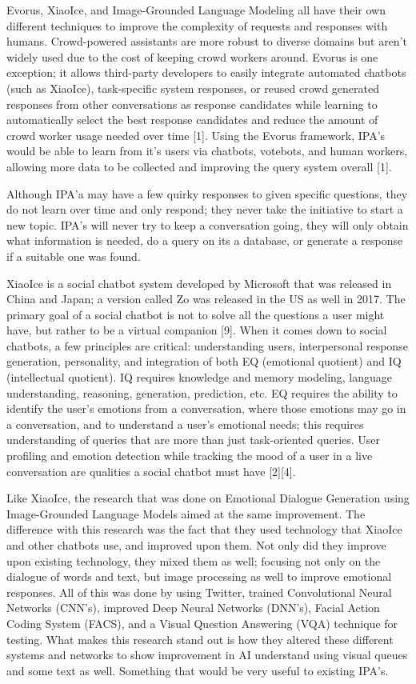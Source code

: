 \documentclass[letterpaper, 10 pt, conference]{IEEEtran}
\begin{document}
Evorus, XiaoIce, and Image-Grounded Language Modeling all have their own different techniques to improve the complexity of requests and responses with humans. Crowd-powered assistants are more robust to diverse domains but aren't widely used due to the cost of keeping crowd workers around. Evorus is one exception; it allows third-party developers to easily integrate automated chatbots (such as XiaoIce), task-specific system responses, or reused crowd generated responses from other conversations as response candidates while learning to automatically select the best response candidates and reduce the amount of crowd worker usage needed over time [1]. Using the Evorus framework, IPA's would be able to learn from it's users via chatbots, votebots, and human workers, allowing more data to be collected and improving the query system overall [1].
\par Although IPA'a may have a few quirky responses to given specific questions, they do not learn over time and only respond; they never take the initiative to start a new topic. IPA's will never try to keep a conversation going, they will only obtain what information is needed, do a query on its a database, or generate a response if a suitable one was found. 
\par XiaoIce is a social chatbot system developed by Microsoft that was released in China and Japan; a version called Zo was released in the US as well in 2017. The primary goal of a social chatbot is not to solve all the questions a user might have, but rather to be a virtual companion [9]. When it comes down to social chatbots, a few principles are critical: understanding users, interpersonal response generation, personality, and integration of both EQ (emotional quotient) and IQ (intellectual quotient). IQ requires knowledge and memory modeling, language understanding, reasoning, generation, prediction, etc. EQ requires the ability to identify the user's emotions from a conversation, where those emotions may go in a conversation, and to understand a user's emotional needs; this requires understanding of queries that are more than just task-oriented queries. User profiling and emotion detection while tracking the mood of a user in a live conversation are qualities a social chatbot must have [2][4].
\par Like XiaoIce, the research that was done on Emotional Dialogue Generation using Image-Grounded Language Models aimed at the same improvement. The difference with this research was the fact that they used technology that XiaoIce and other chatbots use, and improved upon them. Not only did they improve upon existing technology, they mixed them as well; focusing not only on the dialogue of words and text, but image processing as well to improve emotional responses. All of this was done by using Twitter, trained Convolutional Neural Networks (CNN's), improved Deep Neural Networks (DNN's), Facial Action Coding System (FACS), and a Visual Question Answering (VQA) technique for testing. What makes this research stand out is how they altered these different systems and networks to show improvement in AI understand using visual queues and some text as well. Something that would be very useful to existing IPA's.
\end{document}
